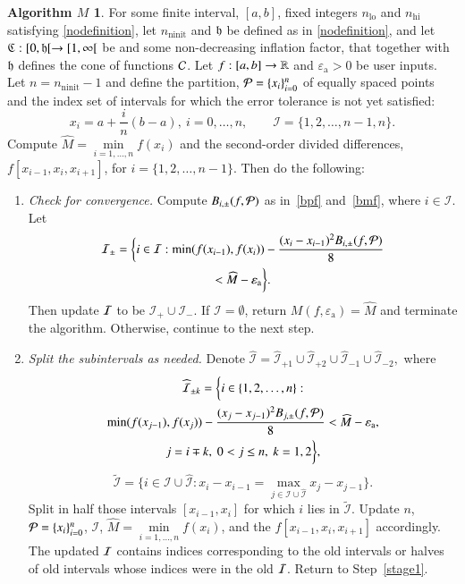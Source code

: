 \documentclass[review]{elsarticle}
\newcommand{\abstol}{\varepsilon_{\textrm{a}}}
\theoremstyle{definition}
\newtheorem*{algoM}{Algorithm $M$}
\newcommand{\hM}{\widehat{M}}
\DeclareMathOperator{\lo}{lo}
\DeclareMathOperator{\ninit}{ninit}
\newcommand{\minfi}{\min\limits_{i=1, \ldots,  n} f(x_i)} %
\newcommand{\minfii}{\min(f(x_{i-1}), f(x_i))} %
\begin{document}
\begin{algoM} \label{AlgoM}
	For some finite interval, $[a,b]$,  fixed integers $n_{\lo}$ and $n_{\text{hi}}$ satisfying \eqref{nodefinition}, let $n_{\ninit}$ and $\mathfrak{h}$ be defined as in \eqref{nodefinition}, and let  $\mathfrak{C}:[0,\mathfrak{h}[ \to [1, \infty[$ be and some non-decreasing inflation factor, that together with $\mathfrak{h}$ defines the cone of functions $\mathcal{C}$.  Let $f:[a,b] \to \mathbb{R}$ and $\abstol >0$ be
	user inputs.  Let  $n=n_{\ninit}-1$ and define the partition, $\mathcal{P} = \{x_i\}_{i=0}^n$ of  equally spaced points and the index set of intervals for which the error tolerance
	is not yet satisfied:
	$$x_i=a+\frac{i}{n}(b-a), \ i=0,\ldots,n, \qquad
	\mathcal{I} = \{1,2,\ldots,n-1,n\}.$$
	Compute $\hM= \minfi$ and the second-order divided differences, $f[x_{i-1},
	x_{i}, x_{i+1}]$, for $i = \{1,2,\ldots,n-1\}$. Then do the
	following:
	
	\begin{enumerate}[\em Step 1.]%
		\item \label{stagemin1} \emph{Check for convergence.}
		Compute $B_{i,\pm}(f,\mathcal{P})$ as in~\eqref{bpf} and~\eqref{bmf}, where $i \in \mathcal{I}$.
		Let
		\begin{multline*}
		\mathcal{I}_\pm = \biggl\{i \in \mathcal{I}: \minfii -\frac{(x_i - x_{i-1})^2B_{i,\pm}(f,\cp)}{8}  \\
		< \widehat{M}-\abstol \biggr\}.
		\end{multline*}
		Then update $\mathcal{I}$ to be $\mathcal{I}_+ \cup \mathcal{I}_-$.  If $\mathcal{I} = \emptyset$, return $M(f,\abstol) = \widehat{M}$ and terminate the algorithm.
		Otherwise, continue to the next step.
		\item \label{stagemin2} \emph{Split the subintervals as needed.}
		Denote $\widehat{\mathcal{I}}=\widehat{\mathcal{I}}_{+1} \cup \widehat{\mathcal{I}}_{+2} \cup \widehat{\mathcal{I}}_{-1} \cup \widehat{\mathcal{I}}_{-2},$ where
		\begin{multline*}
		\widehat{\mathcal{I}}_{\pm k} = \biggl\{i \in \{1,2,\ldots,n\}:  \\
		\min(f(x_{j-1}),f(x_{j})) -\frac{(x_j - x_{j-1})^2B_{j,\pm}(f,\cp)}{8}  < \widehat{M}-\abstol,\\
		j=i\mp k,\ 0<j\le n,\ k=1,2 \biggr\},
		\end{multline*}
		\[\widetilde{\mathcal{I}}=\biggl\{i \in \mathcal{I} \cup \widehat{\mathcal{I}}: x_i - x_{i-1}=\max\limits_{j \in \mathcal{I} \cup \widehat{\mathcal{I}} } x_j-x_{j-1} \biggr\}.\]
		Split in half those intervals $[x_{i-1},x_i]$ for which $i$ lies in $\widetilde{\mathcal{I}}$.
		Update $n$, $\mathcal{P} = \{x_i\}_{i=0}^n$, $\mathcal{I}$, $\hM = \minfi$, and the $f[x_{i-1}, x_{i}, x_{i+1}]$ accordingly.  The updated $\mathcal{I}$ contains  indices corresponding to the old intervals or halves of old intervals whose indices were in the old $\mathcal{I}$.  Return to Step~\ref{stage1}.
	\end{enumerate}
\end{algoM}
\end{document}
